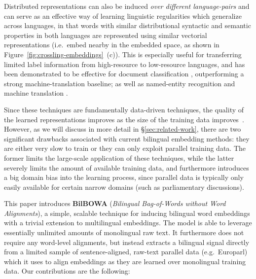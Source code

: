 \documentclass[10pt]{article}
\begin{document}
Distributed representations can also be induced \emph{over different
language-pairs} and can serve as an effective way of learning linguistic
regularities which generalize across languages, in that words with similar
distributional syntactic and semantic properties in both languages are
represented using similar vectorial representations (i.e.\ embed nearby in the
embedded space, as shown in Figure~\ref{fig:crossling-embeddings}~(c)).  This
is especially useful for transferring limited label information from
high-resource to low-resource languages, and has been demonstrated to be
effective for document classification \cite{klementiev2012}, outperforming a
strong machine-translation baseline; as well as named-entity recognition and
machine translation \cite{zoubilingual,mikolov2013exploiting}.  

Since these techniques are fundamentally data-driven techniques, the quality of
the learned representations improves as the size of the training data
improves~\cite{mikolov2013distributed,pennington2014glove}.  However, as we
will discuss in more detail in \S \ref{sec:related-work}, there are two
significant drawbacks associated with current bilingual embedding methods: they
are either very slow to train or they can only exploit parallel training data.
The former limits the large-scale application of these techniques, while the
latter severely limits the amount of available training data, and
furthermore introduces a big domain bias into the learning process, since parallel
data is typically only easily available for certain narrow domains (such as
parliamentary discussions).




This paper introduces \textbf{BilBOWA} (\emph{Bilingual
Bag-of-Words without Word Alignments}), a simple, scalable
technique for inducing bilingual word embeddings with a trivial extension to
multilingual embeddings. The model is able to leverage essentially unlimited 
amounts of monolingual raw text. It furthermore does not require any word-level 
alignments, but instead extracts a bilingual signal directly from a limited sample of
sentence-aligned, raw-text parallel data (e.g.\ Europarl) which it uses to
align embeddings as they are learned over monolingual training data. Our
contributions are the following:
\end{document}
